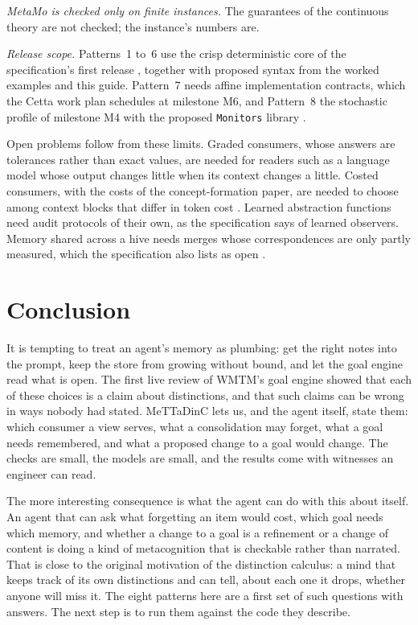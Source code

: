 \documentclass[11pt]{article}
\newcommand{\code}[1]{\texttt{#1}}
\theoremstyle{definition}
\theoremstyle{plain}
\begin{document}
\emph{MetaMo is checked only on finite instances.} The guarantees of the continuous theory are not
checked; the instance's numbers are.

\emph{Release scope.} Patterns~1 to~6 use the crisp deterministic core of the specification's first
release \cite[Section~16.1]{spec}, together with proposed syntax from the worked examples and this
guide. Pattern~7 needs affine implementation contracts, which the Cetta work plan schedules at
milestone M6, and Pattern~8 the stochastic profile of milestone M4 with the proposed
\code{Monitors} library \cite{cettaguide}.

Open problems follow from these limits. Graded consumers, whose answers are tolerances rather than
exact values, are needed for readers such as a language model whose output changes little when its
context changes a little. Costed consumers, with the costs of the concept-formation paper, are
needed to choose among context blocks that differ in token cost \cite{concept}. Learned abstraction functions need
audit protocols of their own, as the specification says of learned observers. Memory shared across a
hive needs merges whose correspondences are only partly measured, which the specification also lists
as open \cite[Section~16.5]{spec}.

\section{Conclusion}\label{sec:conclusion}

It is tempting to treat an agent's memory as plumbing: get the right notes into the prompt, keep
the store from growing without bound, and let the goal engine read what is open. The first live
review of WMTM's goal engine showed that each of these choices is a claim about distinctions, and
that such claims can be wrong in ways nobody had stated. MeTTaDinC lets us, and the agent itself,
state them: which consumer a view serves, what a consolidation may forget, what a goal needs
remembered, and what a proposed change to a goal would change. The checks are small, the models are small, and the results
come with witnesses an engineer can read.

The more interesting consequence is what the agent can do with this about itself. An agent that can
ask what forgetting an item would cost, which goal needs which memory, and whether a change to a
goal is a refinement or a change of content is doing a kind of metacognition that is checkable
rather than narrated. That is close to the original motivation of the distinction calculus: a mind
that keeps track of its own distinctions and can tell, about each one it drops, whether anyone will
miss it. The eight patterns here are a first set of such questions with answers. The next step is
to run them against the code they describe.
\end{document}
